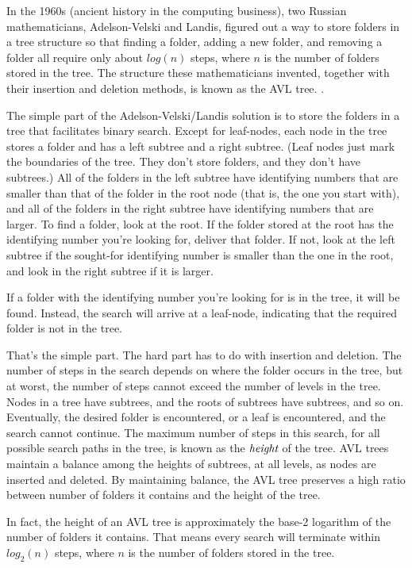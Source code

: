 In the 1960s (ancient history in the computing business), 
two Russian mathematicians, Adelson-Velski and Landis,
figured out a way to store folders in a tree structure so that
finding a folder, adding a new folder, and removing a folder all
require only about $log(n)$ steps, where $n$ is the number
of folders stored in the tree. The structure these mathematicians
invented, together with their insertion and deletion methods, is
known as the AVL tree. \label{AVL-tree}.

The simple part of the Adelson-Velski/Landis solution is to store
the folders in a tree that facilitates binary search. Except for
leaf-nodes, each node in the tree stores a folder and has a left
subtree and a right subtree. (Leaf nodes just mark the boundaries of
the tree. They don't store folders, and they don't have subtrees.)
All of the folders in the left subtree have identifying numbers that
are smaller than that of the folder in the root node (that is,
the one you start with), and all of
the folders in the right subtree have identifying numbers that are larger.
To find a folder, look at the root. If the folder stored at
the root has the identifying number you're looking for, deliver that folder.
If not, look at the left subtree if the sought-for identifying number
is smaller than the one in the root, and look in the right subtree
if it is larger.

If a folder with the identifying number you're looking for is in the tree,
it will be found. Instead, the search will arrive at a leaf-node,
indicating that the required folder is not in the tree.

That's the simple part. The hard part has to do with insertion and
deletion. The number of steps in the search depends on where the
folder occurs in the tree, but at worst, the number of steps cannot
exceed the number of levels in the tree. Nodes in a tree have
subtrees, and the roots of subtrees have subtrees, and so on.
Eventually, the desired folder is encountered, or a leaf is
encountered, and the search cannot continue. The maximum number of
steps in this search, for all possible search paths in the tree, is
known as the $\emph{height}$ of the tree.
AVL trees maintain a balance among the heights of subtrees, at all levels, as
nodes are inserted and deleted. By maintaining balance, the AVL tree
preserves a high ratio between number of folders it contains and the
height of the tree.

In fact, the height of an AVL tree is approximately the base-2
logarithm of the number of folders it contains. That means every
search will terminate within $log_2(n)$ steps, where $n$ is the
number of folders stored in the tree.

